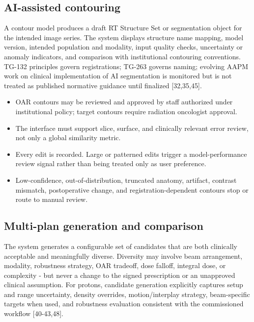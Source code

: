 \documentclass[11pt,letterpaper]{article}
\begin{document}
\subsection{AI-assisted contouring}

A contour model produces a draft RT Structure Set or segmentation object for the intended image series. The system displays structure name mapping, model version, intended population and modality, input quality checks, uncertainty or anomaly indicators, and comparison with institutional contouring conventions. TG-132 principles govern registrations; TG-263 governs naming; evolving AAPM work on clinical implementation of AI segmentation is monitored but is not treated as published normative guidance until finalized [32,35,45].

\begin{itemize}
\item OAR contours may be reviewed and approved by staff authorized under institutional policy; target contours require radiation oncologist approval.
\item The interface must support slice, surface, and clinically relevant error review, not only a global similarity metric.
\item Every edit is recorded. Large or patterned edits trigger a model-performance review signal rather than being treated only as user preference.
\item Low-confidence, out-of-distribution, truncated anatomy, artifact, contrast mismatch, postoperative change, and registration-dependent contours stop or route to manual review.
\end{itemize}

\subsection{Multi-plan generation and comparison}

The system generates a configurable set of candidates that are both clinically acceptable and meaningfully diverse. Diversity may involve beam arrangement, modality, robustness strategy, OAR tradeoff, dose falloff, integral dose, or complexity - but never a change to the signed prescription or an unapproved clinical assumption. For protons, candidate generation explicitly captures setup and range uncertainty, density overrides, motion\slash\allowbreak{}interplay strategy, beam-specific targets when used, and robustness evaluation consistent with the commissioned workflow [40-43,48].
\end{document}
